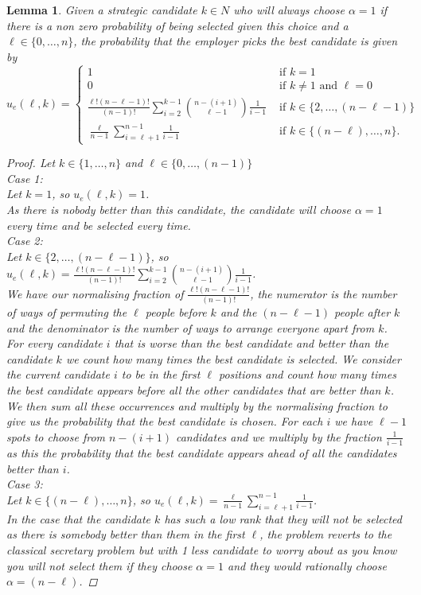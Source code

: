 \documentclass{article}
\newtheorem{lemma}{Lemma}
\begin{document}
\begin{lemma}\label{lemma:employer_probabilities_no_br}
Given a strategic candidate $k \in N$ who will always choose $\alpha=1$ if there is a non zero probability of being selected given this choice and a $\ell \in \{0, \ldots, n \} $,
the probability that the employer picks the best candidate is given by 
$$
    u_e(\ell,k) = 
\begin{cases}
    1 & \text{ if } k = 1 \\
    0 & \text{ if } k \neq 1 \text{ and } \ell = 0 \\
    \frac{\ell!(n-\ell-1)!}{(n-1)!}\sum_{i = 2}^{k-1}\binom{n-(i+1)}{\ell-1}\frac{1}{i-1} & \text{ if } k \in \{2, \ldots, (n-\ell-1) \} \\
    \frac{\ell}{n-1}\sum_{i = \ell + 1}^{n-1}\frac{1}{i-1} & \text{ if } k \in \{(n-\ell), \ldots, n \}.
\end{cases}
$$
 
\begin{proof}
Let $k \in \{1,\ldots, n\}$ and $\ell \in \{0,\ldots, (n - 1) \}$ \\
Case 1: \\
Let $k = 1$, so $u_e(\ell,k) = 1$. \\
As there is nobody better than this candidate, the candidate will choose $\alpha =1$ every time and be selected every time. \\
Case 2: \\
Let $k \in \{2, \ldots, (n-\ell-1) \} $, so $u_e(\ell,k) = \frac{\ell!(n-\ell-1)!}{(n-1)!}\sum_{i = 2}^{k-1}\binom{n-(i+1)}{\ell-1}\frac{1}{i-1}$. \\
We have our normalising fraction of $\frac{\ell!(n-\ell-1)!}{(n-1)!}$, the numerator is the number of ways of permuting the $\ell$ people before $k$ and the $(n-\ell-1)$ people after $k$ and the denominator is the number of ways to arrange everyone apart from $k$. For every candidate $i$ that is worse than the best candidate and better than the candidate $k$ we count how many times the best candidate is selected. We consider the current candidate $i$ to be in the first $\ell$ positions and count how many times the best candidate appears before all the other candidates that are better than $k$. We then sum all these occurrences and multiply by the normalising fraction to give us the probability that the best candidate is chosen. For each $i$ we have $\ell-1$ spots to choose from $n-(i+1)$ candidates and we multiply by the fraction $\frac{1}{i-1}$ as this the probability that the best candidate appears ahead of all the candidates better than $i$. \\
Case 3: \\
Let $k \in \{(n-\ell), \ldots, n \}$, so $u_e(\ell,k) = \frac{\ell}{n-1}\sum_{i = \ell + 1}^{n-1}\frac{1}{i-1}$. \\
In the case that the candidate $k$ has such a low rank that they will not be selected as there is somebody better than them in the first $\ell$, the problem reverts to the classical secretary problem but with 1 less candidate to worry about as you know you will not select them if they choose $\alpha = 1$ and they would rationally choose $\alpha = (n-\ell)$.
\end{proof}
\end{lemma}
\end{document}
